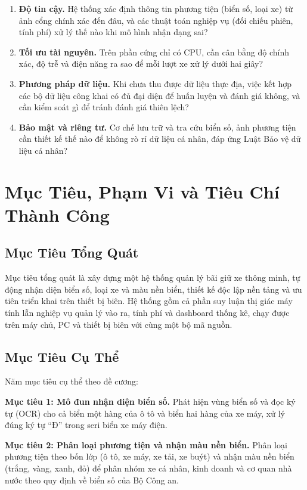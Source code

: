 \begin{enumerate}[leftmargin=*, label=\textbf{CH\arabic*.}]
  \item \textbf{Độ tin cậy.} Hệ thống xác định thông tin phương tiện (biển số, loại xe) từ ảnh cổng chính xác đến đâu, và các thuật toán nghiệp vụ (đối chiếu phiên, tính phí) xử lý thế nào khi mô hình nhận dạng sai?
  \item \textbf{Tối ưu tài nguyên.} Trên phần cứng chỉ có CPU, cần cân bằng độ chính xác, độ trễ và điện năng ra sao để mỗi lượt xe xử lý dưới hai giây?
  \item \textbf{Phương pháp dữ liệu.} Khi chưa thu được dữ liệu thực địa, việc kết hợp các bộ dữ liệu công khai có đủ đại diện để huấn luyện và đánh giá không, và cần kiểm soát gì để tránh đánh giá thiên lệch?
  \item \textbf{Bảo mật và riêng tư.} Cơ chế lưu trữ và tra cứu biển số, ảnh phương tiện cần thiết kế thế nào để không rò rỉ dữ liệu cá nhân, đáp ứng Luật Bảo vệ dữ liệu cá nhân?
\end{enumerate}

\section{Mục Tiêu, Phạm Vi và Tiêu Chí Thành Công}

\subsection{Mục Tiêu Tổng Quát}

Mục tiêu tổng quát là xây dựng một hệ thống quản lý bãi giữ xe thông minh, tự động nhận
diện biển số, loại xe và màu nền biển, thiết kế độc lập nền tảng và ưu tiên triển khai
trên thiết bị biên. Hệ thống gồm cả phần suy luận thị giác máy tính lẫn nghiệp vụ quản
lý vào ra, tính phí và dashboard thống kê, chạy được trên máy chủ, PC và thiết bị biên
với cùng một bộ mã nguồn.

\subsection{Mục Tiêu Cụ Thể}

Năm mục tiêu cụ thể theo đề cương:

\textbf{Mục tiêu 1: Mô đun nhận diện biển số.}
Phát hiện vùng biển số và đọc ký tự (OCR) cho cả biển một hàng của ô tô và biển hai
hàng của xe máy, xử lý đúng ký tự ``Đ'' trong seri biển xe máy điện.

\textbf{Mục tiêu 2: Phân loại phương tiện và nhận màu nền biển.}
Phân loại phương tiện theo bốn lớp (ô tô, xe máy, xe tải, xe buýt) và nhận màu nền biển
(trắng, vàng, xanh, đỏ) để phân nhóm xe cá nhân, kinh doanh và cơ quan nhà nước theo
quy định về biển số của Bộ Công an.

